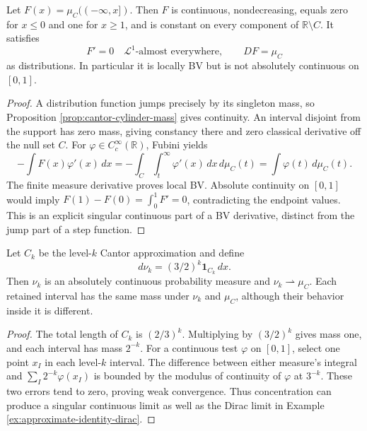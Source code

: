 \begin{example}\label{ex:cantor-function-bv}
Let $F(x)=\mu_C(( -\infty,x])$. Then $F$ is continuous, nondecreasing, equals zero for $x\leq0$ and one for $x\geq1$, and is constant on every component of $\mathbb R\setminus C$. It satisfies
\[
 F'=0\quad\mathcal L^1\text{-almost everywhere},\qquad DF=\mu_C
\]
as distributions. In particular it is locally BV but is not absolutely continuous on $[0,1]$.
\end{example}
\begin{proof}
A distribution function jumps precisely by its singleton mass, so Proposition \ref{prop:cantor-cylinder-mass} gives continuity. An interval disjoint from the support has zero mass, giving constancy there and zero classical derivative off the null set $C$. For $\varphi\in C_c^\infty(\mathbb R)$, Fubini yields
\[
 -\int F(x)\varphi'(x)\,dx
 =-\int_C\int_t^\infty\varphi'(x)\,dx\,d\mu_C(t)
 =\int\varphi(t)\,d\mu_C(t).
\]
The finite measure derivative proves local BV. Absolute continuity on $[0,1]$ would imply $F(1)-F(0)=\int_0^1F'=0$, contradicting the endpoint values. This is an explicit singular continuous part of a BV derivative, distinct from the jump part of a step function.
\end{proof}


\begin{example}\label{ex:cantor-density-approximation}
Let $C_k$ be the level-$k$ Cantor approximation and define
\[
 d\nu_k=(3/2)^k\mathbf1_{C_k}\,dx.
\]
Then $\nu_k$ is an absolutely continuous probability measure and $\nu_k\rightharpoonup\mu_C$. Each retained interval has the same mass under $\nu_k$ and $\mu_C$, although their behavior inside it is different.
\end{example}
\begin{proof}
The total length of $C_k$ is $(2/3)^k$. Multiplying by $(3/2)^k$ gives mass one, and each interval has mass $2^{-k}$. For a continuous test $\varphi$ on $[0,1]$, select one point $x_I$ in each level-$k$ interval. The difference between either measure's integral and $\sum_I2^{-k}\varphi(x_I)$ is bounded by the modulus of continuity of $\varphi$ at $3^{-k}$. These two errors tend to zero, proving weak convergence. Thus concentration can produce a singular continuous limit as well as the Dirac limit in Example \ref{ex:approximate-identity-dirac}.
\end{proof}

